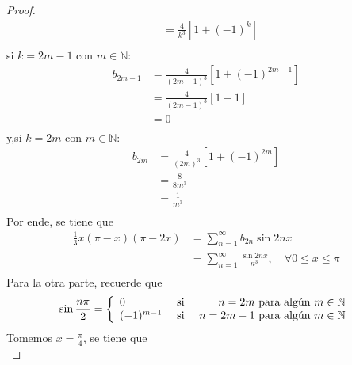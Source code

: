 \documentclass[12pt]{report}
\theoremstyle{largebreak}
\renewcommand{\leq}{\ensuremath{\leqslant}}
\begin{document}
\begin{proof}
\begin{equation*}
\begin{split}
                &=\frac{4}{k^3}\left[1+(-1)^k\right]\\
            \end{split}
        \end{equation*}
        si $k=2m-1$ con $m\in\mathbb{N}$:
        \begin{equation*}
            \begin{split}
                b_{ 2m-1}&=\frac{4}{(2m-1)^3}\left[1+(-1)^{2m-1}\right]\\
                &=\frac{4}{(2m-1)^3}\left[1-1\right]\\
                &=0\\
            \end{split}
        \end{equation*}
        y,si $k=2m$ con $m\in\mathbb{N}$:
        \begin{equation*}
            \begin{split}
                b_{2m}&=\frac{4}{(2m)^3}\left[1+(-1)^{2m}\right]\\
                &=\frac{8}{8m^3}\\
                &=\frac{1}{m^3}\\
            \end{split}
        \end{equation*}
        Por ende, se tiene que
        \begin{equation*}
            \begin{split}
                \frac{1}{3}x(\pi-x)(\pi-2x)&=\sum_{n=1}^\infty b_{ 2n}\sin 2nx\\
                &=\sum_{n=1}^\infty\frac{\sin 2nx}{n^3},\quad\forall 0\leq x\leq\pi \\
            \end{split}
        \end{equation*}
        Para la otra parte, recuerde que
        \begin{equation*}
            \sin\frac{n\pi}{2}=\left\{
                \begin{array}{lcr}
                    0 & \textup{ si } & n=2m\textup{ para algún }m\in\mathbb{N}\\
                    (-1)^{m-1} & \textup{ si } & n=2m-1\textup{ para algún }m\in\mathbb{N} \\
                \end{array}
            \right.
        \end{equation*}
        Tomemos $x=\frac{\pi}{4}$, se tiene que
        \begin{equation*}

\end{equation*}
\end{proof}
\end{document}
